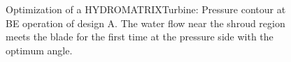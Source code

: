 \begin{figure}[h!]
\begin{minipage}[b]{1\linewidth}
 \centering
\end{minipage}
\caption{Optimization of a HYDROMATRIX\circledR Turbine: Pressure contour at BE operation of design A. The water flow near the shroud region meets the blade for the first time at the pressure side with the optimum angle. }
\label{design-BE-M}
\end{figure}
